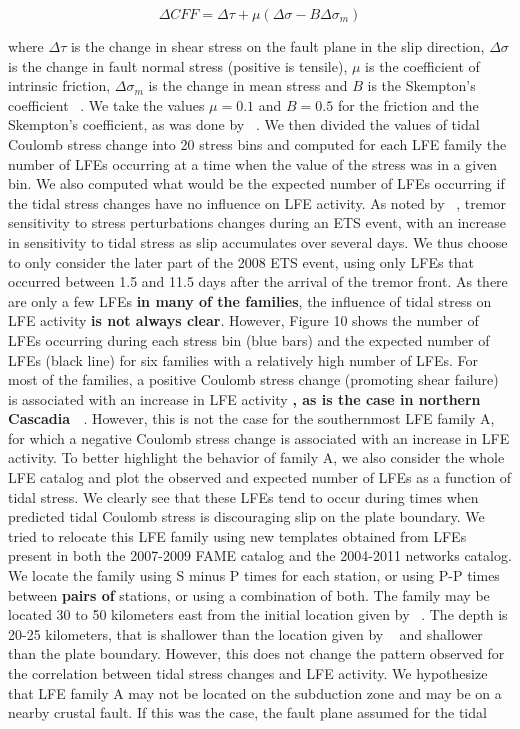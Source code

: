 \documentclass[draft]{agujournal2019}
\begin{document}
\begin{linenomath*}
\begin{equation}
\Delta CFF = \Delta \tau + \mu \left( \Delta \sigma - B \Delta \sigma_m \right)
\end{equation}
\end{linenomath*}

where $\Delta \tau$ is the change in shear stress on the fault plane in the slip direction, $\Delta \sigma$ is the change in fault normal stress (positive is tensile), $\mu$ is the coefficient of intrinsic friction, $\Delta \sigma_m$ is the change in mean stress and $B$ is the Skempton's coefficient ~\cite{HOU_2015}. We take the values $\mu = 0.1$ and $B = 0.5$ for the friction and the Skempton's coefficient, as was done by ~. We then divided the values of tidal Coulomb stress change into 20 stress bins and computed for each LFE family the number of LFEs occurring at a time when the value of the stress was in a given bin. We also computed what would be the expected number of LFEs occurring if the tidal stress changes have no influence on LFE activity. As noted by ~, tremor sensitivity to stress perturbations changes during an ETS event, with an increase in sensitivity to tidal stress as slip accumulates over several days. We thus choose to only consider the later part of the 2008 ETS event, using only LFEs that occurred between 1.5 and 11.5 days after the arrival of the tremor front. As there are only a few LFEs \textbf{in many of the families}, the influence of tidal stress on LFE activity \textbf{is not always clear}. However, Figure 10 shows the number of LFEs occurring during each stress bin (blue bars) and the expected number of LFEs (black line) for six families with a relatively high number of LFEs. For most of the families, a positive Coulomb stress change (promoting shear failure) is associated with an increase in LFE activity \textbf{, as is the case in northern Cascadia ~\cite{HOU_2015}}. However, this is not the case for the southernmost LFE family A, for which a negative Coulomb stress change is associated with an increase in LFE activity. To better highlight the behavior of family A, we also consider the whole LFE catalog and plot the observed and expected number of LFEs as a function of tidal stress. We clearly see that these LFEs tend to occur during times when predicted tidal Coulomb stress is discouraging slip on the plate boundary. We tried to relocate this LFE family using new templates obtained from LFEs present in both the 2007-2009 FAME catalog and the 2004-2011 networks catalog. We locate the family using S minus P times for each station, or using P-P times between \textbf{pairs of} stations, or using a combination of both. The family may be located 30 to 50 kilometers east from the initial location given by ~. The depth is 20-25 kilometers, that is shallower than the location given by ~ and shallower than the plate boundary. However, this does not change the pattern observed for the correlation between tidal stress changes and LFE activity. We hypothesize that LFE family A may not be located on the subduction zone and may be on a nearby crustal fault. If this was the case, the fault plane assumed for the tidal 
\end{document}
